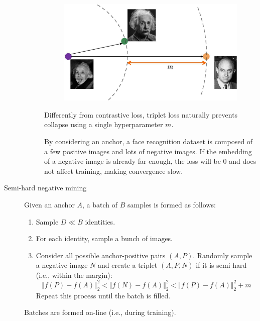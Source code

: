 \begin{description}
\begin{description}
                \begin{figure}[H]
                    \centering
                    \includegraphics[width=0.45\linewidth]{./img/_triplet_loss.jpg}
                \end{figure}

                \begin{remark}
                    Differently from contrastive loss, triplet loss naturally prevents collapse using a single hyperparameter $m$.
                \end{remark}

                \begin{remark}
                    By considering an anchor, a face recognition dataset is composed of a few positive images and lots of negative images. If the embedding of a negative image is already far enough, the loss will be $0$ and does not affect training, making convergence slow.
                \end{remark}
        \end{description}

    \item[Semi-hard negative mining] 
        Given an anchor $A$, a batch of $B$ samples is formed as follows:
        \begin{enumerate}
            \item Sample $D \ll B$ identities.
            \item For each identity, sample a bunch of images.
            \item Consider all possible anchor-positive pairs $(A, P)$. Randomly sample a negative image $N$ and create a triplet $(A, P, N)$ if it is semi-hard (i.e., within the margin):
            \[ \Vert f(P) - f(A) \Vert_2^2 < \Vert f(N) - f(A) \Vert_2^2 < \Vert f(P) - f(A) \Vert_2^2 + m \]
            Repeat this process until the batch is filled.
        \end{enumerate}

        \begin{remark}
            Batches are formed on-line (i.e., during training).
        \end{remark}


\end{description}
